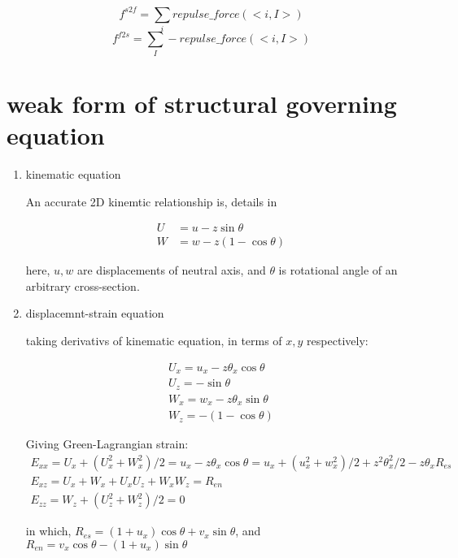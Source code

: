 \documentclass[11pt]{article}
\begin{document}
$$ f^{s2f} = \sum_i repulse\_force(<i,I>) $$
$$ f^{f2s} = \sum_I -repulse\_force(<i,I>) $$

\section{weak form of structural governing equation}

\begin{enumerate}

\item{kinematic equation}

An accurate 2D kinemtic relationship is, details in \cite[p.~215]{limingrui}

\begin{subequations}
 \begin{align}
	U &= u - z \sin \theta \\
	W &= w - z(1- \cos \theta)
  \end{align}
 \end{subequations}

here, $u, w$ are displacements of neutral axis, and $\theta$ is rotational angle of an arbitrary cross-section.

\item{displacemnt-strain equation}

taking derivativs of kinematic equation, in terms of $x,y$ respectively:

 \begin{subequations}
	\begin{align}
	U_x = u_x - z \theta_x \cos \theta \\
	U_z = - \sin \theta \\
	W_x = w_x - z \theta_x \sin \theta \\
	W_z = -(1- \cos \theta)
	\end{align}
\end{subequations}

Giving Green-Lagrangian strain:
 \begin{subequations}
	\begin{align}
	E_{xx} = U_x + ( U_x^2 + W_x^2)/2 = u_x - z \theta_x \cos \theta = u_x + ( u_x^2 + w_x^2)/2 + z^2 \theta_x^2/2 - z \theta_x R_{es}  \\
	E_{xz} = U_x + W_x + U_x U_z + W_x W_z = R_{en} \\ 
	E_{zz} = W_z + ( U_z^2 + W_z^2)/2 = 0
	\end{align}
\end{subequations}

in which, $ R_{es} = (1 + u_x) \cos \theta + v_x \sin \theta $, and $R_{en} = v_x \cos \theta - ( 1 + u_x) \sin \theta$


\end{enumerate}
\end{document}
